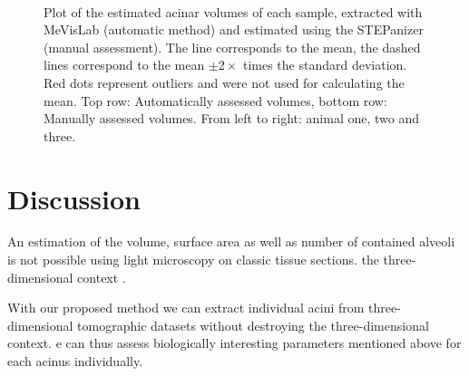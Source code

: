 \documentclass[final,paper=a4,DIV=calc,abstract,english]{scrartcl}
\newcommand{\imsize}{\linewidth}
\newcommand{\biggerthan}{2\xspace} %
\begin{document}
\renewcommand{\imsize}{0.35\textwidth}
\begin{figure}[htb]
	\centering
	\subfloat{
		}\hfill%
	\subfloat{
		
		}\hfill%
	\subfloat{
		
		}\\%
	\subfloat{
		
		}\hfill%
	\subfloat{
		
		}\hfill%
	\subfloat{
		
		}%
	\caption{Plot of the estimated acinar volumes of each sample, extracted with MeVisLab (automatic method) and estimated using the STEPanizer (manual assessment).
		The line corresponds to the mean, the dashed lines correspond to the mean $\pm\biggerthan\times$ times the standard deviation.
		Red dots represent outliers and were not used for calculating the mean.
		Top row: Automatically assessed volumes, bottom row: Manually assessed volumes.
		From left to right: animal one, two and three.}
	\label{fig:Volume plots}
\end{figure}

\section{Discussion}\label{sec:discussion}

An estimation of the volume,  surface area as well as  number of contained alveoli  is not possible using light microscopy on classic tissue sections.
 the three-dimensional context .

With our proposed method we can extract individual acini from three-dimensional tomographic datasets without destroying the three-dimensional context.
e can thus assess  biologically interesting parameters mentioned above for each acinus individually.
\end{document}
